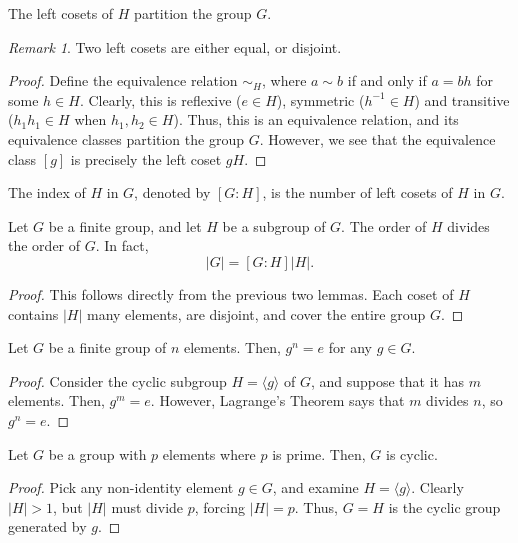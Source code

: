 \documentclass[11pt]{article}
\theoremstyle{definition}
\theoremstyle{remark}
\newtheorem*{remark}{Remark}
\numberwithin{equation}{section}
\begin{document}
    \begin{lemma}
        The left cosets of $H$ partition the group $G$.
        \begin{remark}
            Two left cosets are either equal, or disjoint.
        \end{remark}
    \end{lemma}
    \begin{proof}
        Define the equivalence relation $\sim_H$, where $a \sim b$ if and only if $a
        = bh$ for some $h \in H$. Clearly, this is reflexive ($e \in H$), symmetric
        ($h^{-1} \in H$) and transitive ($h_1h_1 \in H$ when $h_1, h_2 \in H$). Thus,
        this is an equivalence relation, and its equivalence classes partition the
        group $G$. However, we see that the equivalence class $[g]$ is precisely the
        left coset $gH$.
    \end{proof}

    \begin{definition}
        The index of $H$ in $G$, denoted by $[G : H]$, is the number of left cosets
        of $H$ in $G$.
    \end{definition}

    \begin{theorem}
        Let $G$ be a finite group, and let $H$ be a subgroup of $G$. The order of $H$
        divides the order of $G$. In fact, \[
            |G| = [G : H] |H|.
        \] 
    \end{theorem}
    \begin{proof}
        This follows directly from the previous two lemmas. Each coset of $H$
        contains $|H|$ many elements, are disjoint, and cover the entire group $G$.
    \end{proof}

    \begin{corollary}
        Let $G$ be a finite group of $n$ elements. Then, $g^n = e$ for any $g \in G$.
    \end{corollary}
    \begin{proof}
        Consider the cyclic subgroup $H = \langle g\rangle$ of $G$, and suppose that
        it has $m$ elements. Then, $g^m = e$. However, Lagrange's Theorem says that
        $m$ divides $n$, so $g^n = e$.
    \end{proof}
    \begin{corollary}
        Let $G$ be a group with $p$ elements where $p$ is prime. Then, $G$ is cyclic.
    \end{corollary}
    \begin{proof}
        Pick any non-identity element $g \in G$, and examine $H = \langle g\rangle$.
        Clearly $|H| > 1$, but $|H|$ must divide $p$, forcing $|H| = p$. Thus, $G =
        H$ is the cyclic group generated by $g$.
    \end{proof}
\end{document}
